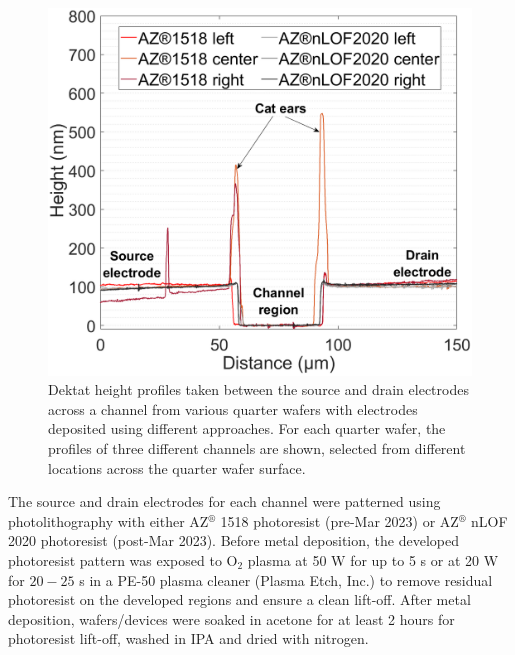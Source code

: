 \documentclass[
  a4paper,
]{scrbook}
\begin{document}
\begin{figure}
\begin{minipage}[t]{0.47\linewidth}
{{\includegraphics{./figures/ch4/dektat_1518nlof_profile_comparison.png}

}

}

\end{minipage}%

\caption{\label{fig-electrodes-dektat}Dektat height profiles taken
between the source and drain electrodes across a channel from various
quarter wafers with electrodes deposited using different approaches. For
each quarter wafer, the profiles of three different channels are shown,
selected from different locations across the quarter wafer surface.}

\end{figure}

The source and drain electrodes for each channel were patterned using
photolithography with either AZ\(^\circledR\) 1518 photoresist (pre-Mar
2023) or AZ\(^\circledR\) nLOF 2020 photoresist (post-Mar 2023). Before
metal deposition, the developed photoresist pattern was exposed to
O\(_2\) plasma at 50 W for up to 5 s or at 20 W for \(20-25\) s in a
PE-50 plasma cleaner (Plasma Etch, Inc.) to remove residual photoresist
on the developed regions and ensure a clean lift-off. After metal
deposition, wafers/devices were soaked in acetone for at least 2 hours
for photoresist lift-off, washed in IPA and dried with nitrogen.
\end{document}
